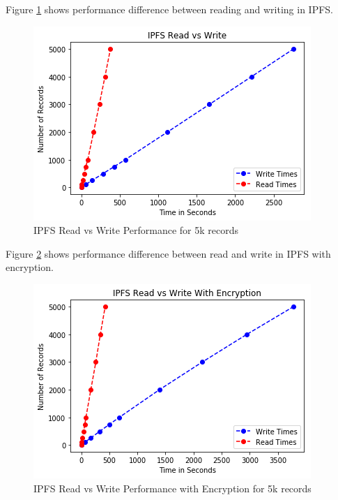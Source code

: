 \documentclass[11pt,openright]{report}
\begin{document}
Figure \ref{fig:graph_ipfs_readvwrite} shows performance difference between reading and writing in IPFS.
\newline
\newline
\begin{figure}[!htbp]
    \centering
    \includegraphics[scale=1]{results/graphs/IPFS_Read_v_Write.png}
    \caption{IPFS Read vs Write Performance for 5k records}
    \label{fig:graph_ipfs_readvwrite}
\end{figure}
\newline
\newline

Figure \ref{fig:graph_ipfs_readvwrite_wencr} shows performance difference between read and write in IPFS with encryption.
\newpage
\hfill\\
\begin{figure}[!htbp]
    \centering
    \includegraphics[scale=1]{results/graphs/IPFS_Read_v_Write_Encr.png}
    \caption{IPFS Read vs Write Performance with Encryption for 5k records}
    \label{fig:graph_ipfs_readvwrite_wencr}
\end{figure}
\newline
\newline
\end{document}

